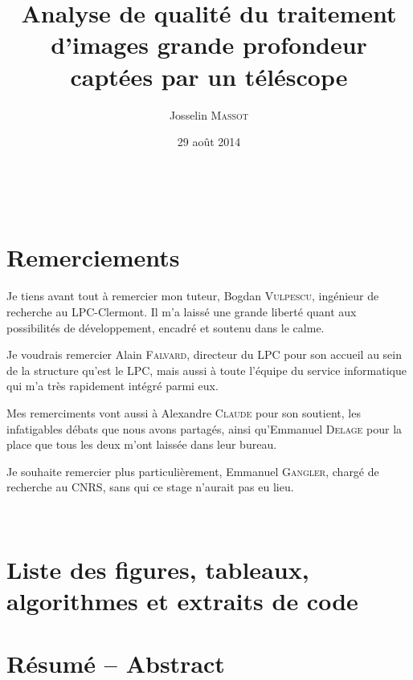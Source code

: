 \documentclass[a4paper, 11pt]{article}
\title{Analyse de qualité du traitement d'images grande profondeur captées par un téléscope}
\author{Josselin \textsc{Massot}}
\date{29 août 2014}
\begin{document}
\renewcommand{\thepage}{}
\pagestyle{plain}

\maketitle


\newpage
{}

\
\vfill
\section*{Remerciements}

Je tiens avant tout à remercier mon tuteur, Bogdan \textsc{Vulpescu}, ingénieur de recherche au LPC-Clermont. Il m'a laissé une grande liberté quant aux possibilités de développement, encadré et soutenu dans le calme.

Je voudrais remercier Alain \textsc{Falvard}, directeur du LPC pour son accueil au sein de la structure qu'est le LPC, mais aussi à toute l'équipe du service informatique qui m'a très rapidement intégré parmi eux.

Mes remerciments vont aussi à Alexandre \textsc{Claude} pour son soutient, les infatigables débats que nous avons partagés, ainsi qu'Emmanuel \textsc{Delage} pour la place que tous les deux m'ont laissée dans leur bureau.

Je souhaite remercier plus particulièrement, Emmanuel \textsc{Gangler}, chargé de recherche au CNRS, sans qui ce stage n'aurait pas eu lieu.

\vfill
\


\newpage

\section*{Liste des figures, tableaux, algorithmes et extraits de code}
\listoffigures
\listoftables
\listofalgorithms
\lstlistoflistings

\newpage

\section*{Résumé -- Abstract}
\end{document}
